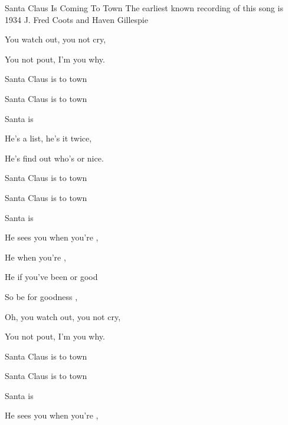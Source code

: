 \begin{SBSong}{Santa Claus Is Coming To Town}
    {The earliest known recording of this song is 1934}
    {J. Fred Coots and Haven Gillespie}
  \begin{SBVerse}
	You  watch out, you  not cry,

	You  not pout, I'm  you why.

	 Santa Claus is  to town

	 Santa Claus is  to town

	 Santa  is    
  \end{SBVerse}
  \begin{SBVerse}
	He's  a list, he's  it twice,

	He's  find out who's  or nice.

	 Santa Claus is  to town

	 Santa Claus is  to town

	 Santa  is   
  \end{SBVerse}
  \begin{SBVerse}
	He sees you when you're ,

	He  when you're ,

	He  if you've been  or good

	So be  for goodness ,
  \end{SBVerse}
  
  \begin{SBVerse}
	Oh, you  watch out, you  not cry,

	You  not pout, I'm  you why.

	 Santa Claus is  to town

	 Santa Claus is  to town

	 Santa  is   
  \end{SBVerse}
  \CBPageBrk
  \begin{SBVerse}
	He sees you when you're ,


\end{SBVerse}
\end{SBSong}
